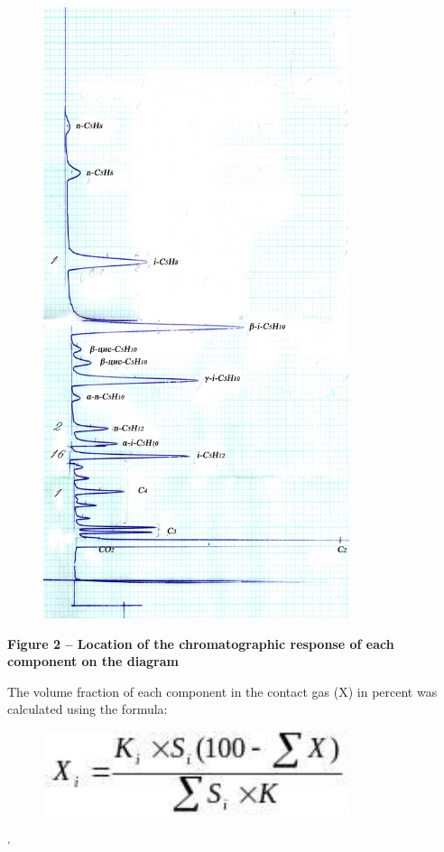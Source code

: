 \begin{figure}[H]
	\centering
	\includegraphics[width=0.8\textwidth]{assets/1054}
	\caption*{}
\end{figure}

\textbf{Figure 2 -- Location of the chromatographic response of each
component on the diagram}

The volume fraction of each component in the contact gas (X) in percent
was calculated using the formula:

\begin{figure}[H]
	\centering
	\includegraphics[width=0.8\textwidth]{assets/1055}
	\caption*{}
\end{figure}\textsuperscript{,}

